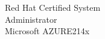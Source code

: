 \documentclass[]{hieudo-build}
\begin{document}
\begin{minipage}[t]{0.34\textwidth}
Red Hat Certified System \\ Administrator \\
Microsoft AZURE214x
\sectionsep





\sectionsep
{}

%
%
\end{minipage} 
\hfill
\end{document}
